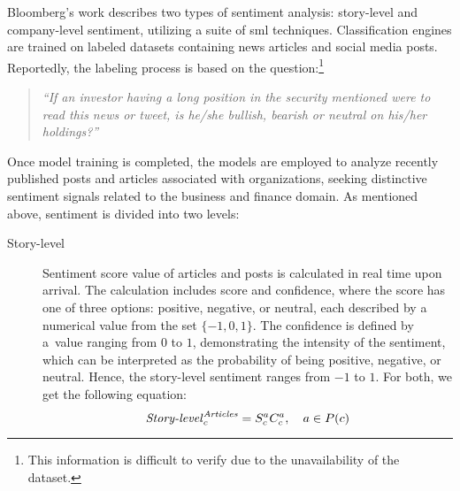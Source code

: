 Bloomberg's work \parencite{bloomberg} describes two types of sentiment analysis: story-level and company-level sentiment, utilizing a suite of \acrshort{sml} techniques. Classification engines are trained on labeled datasets containing news articles and social media posts. Reportedly, the labeling process is based on the question:\footnote{This information is difficult to verify due to the unavailability of the dataset.} \begin{quote}
    \textit{``If an investor having a long position in the security mentioned were to read this news or tweet, is he/she bullish, bearish or neutral on his/her holdings?''}
\end{quote} Once model training is completed, the models are employed to analyze recently published posts and articles associated with organizations, seeking distinctive sentiment signals related to the business and finance domain. As mentioned above, sentiment is divided into two levels:\begin{description}
    \item[Story-level] Sentiment score value of articles and posts is calculated in real time upon arrival. The calculation includes score and confidence, where the score has one of three options: positive, negative, or neutral, each described by a numerical value from the set $\{-1, 0, 1\}$. The confidence is defined by a~value ranging from $0$ to $1$, demonstrating the intensity of the sentiment, which can be interpreted as the probability of being positive, negative, or neutral. Hence, the story-level sentiment ranges from $-1$ to $1$. For both, we get the following equation:
    \begin{equation}
    \label{eq:story-level-article-sentiment}
    \text{\textit{Story-level}}_{c}^{\text{\textit{Articles}}} = S_{c}^{a} C_{c}^{a}, \quad a \in P(c)
    \end{equation}

\end{description}
